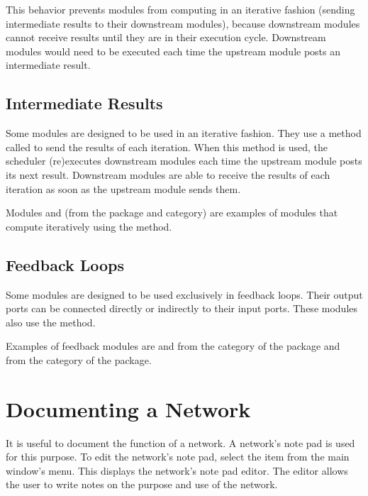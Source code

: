 This behavior prevents modules from computing in an iterative fashion 
(sending intermediate results to their downstream modules), because
downstream modules cannot receive results until they are in their
execution cycle. Downstream modules would need to be executed each time the
upstream module posts an intermediate result.


\subsection{Intermediate Results}

Some modules are designed to be used in an iterative fashion. They use
a method called  to send the results of each
iteration.  When this method is used, the scheduler (re)executes
downstream modules each time the upstream module posts its next
result.  Downstream modules are able to receive the results of each
iteration as soon as the upstream module sends them.

Modules  and  (from the
\package{\sr} package and  category) are examples of modules
that compute iteratively using the  method.

\subsection{Feedback Loops}

Some modules are designed to be used exclusively in feedback
loops. Their output ports can be connected
directly or indirectly to their input ports.  These modules also use the
 method.

Examples of feedback modules are  and
 from the  category of the
 package and  from the
 category of the  package.

\section{Documenting a Network}
\label{sec:docnetwork}

It is useful to document the function of a network.  A network's note
pad is used for this purpose.  To edit the network's note pad,
select the  item from the main window's 
menu.  This displays the network's note pad editor.  The editor
allows the user to write notes on the purpose and use of the network.

